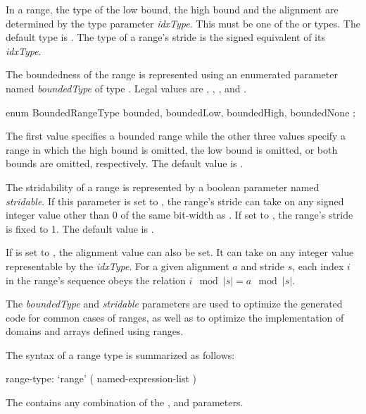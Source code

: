 In a range, the type of the low bound, the high bound and the alignment are
determined by the type parameter \emph{idxType}.
This must be one of the  or
 types.  The default type is .
The type of a range's stride is the signed equivalent of its \emph{idxType}.


The boundedness of the range is represented using an enumerated
parameter named \emph{boundedType} of type .
Legal values are , ,
, and .  
\begin{chapel}
enum BoundedRangeType { bounded, boundedLow, boundedHigh, boundedNone };
\end{chapel}
\noindent
The first value specifies
a bounded range while the other three values specify a range in which
the high bound is omitted, the low bound is omitted, or both bounds
are omitted, respectively.  The default value is .

The stridability of a range is represented by a boolean parameter
named \emph{stridable}.  If this parameter is set to , the range's
stride can take on any signed integer value other than 0 of the same
bit-width as .  If set to , the range's stride is
fixed to 1.  The default value is .

If  is set to , the alignment value can also be set.
It can take on any integer value representable by
the \emph{idxType}.  For a given alignment $a$ and stride $s$, each index $i$
in the range's sequence obeys the relation $i \!\mod |s| = a \!\mod |s|$.  

\begin{rationale}
The \emph{boundedType} and \emph{stridable} parameters are used
to optimize the generated code for common cases of ranges, as well as
to optimize the implementation of domains and arrays defined using ranges.
\end{rationale}

The syntax of a range type is summarized as follows:
\begin{syntax}
range-type:
  `range' ( named-expression-list )
\end{syntax}
\noindent The  contains any combination of
  the ,  and  parameters.

